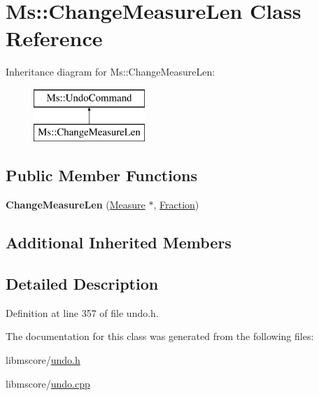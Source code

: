 \hypertarget{class_ms_1_1_change_measure_len}{}\section{Ms\+:\+:Change\+Measure\+Len Class Reference}
\label{class_ms_1_1_change_measure_len}
Inheritance diagram for Ms\+:\+:Change\+Measure\+Len\+:\begin{figure}[H]
\begin{center}
\leavevmode
\includegraphics[height=2.000000cm]{class_ms_1_1_change_measure_len}
\end{center}
\end{figure}
\subsection*{Public Member Functions}
\begin{DoxyCompactItemize}
\item 
\mbox{\label{class_ms_1_1_change_measure_len_afd476784a70270b6867eee2323046b50}} 
{\bfseries Change\+Measure\+Len} (\hyperlink{class_ms_1_1_measure}{Measure} $\ast$, \hyperlink{class_ms_1_1_fraction}{Fraction})
\end{DoxyCompactItemize}
\subsection*{Additional Inherited Members}


\subsection{Detailed Description}


Definition at line 357 of file undo.\+h.



The documentation for this class was generated from the following files\+:\begin{DoxyCompactItemize}
\item 
libmscore/\hyperlink{undo_8h}{undo.\+h}\item 
libmscore/\hyperlink{undo_8cpp}{undo.\+cpp}\end{DoxyCompactItemize}
